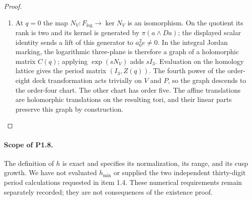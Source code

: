 \begin{proof}
\begin{enumerate}[label=\arabic*.]
\item At $q=0$ the map $N_V:F_{\log}\to\ker N_V$ is an isomorphism.
On the quotient its rank is two and its kernel is generated by
$\pi(a\wedge Da)$; the displayed scalar identity sends a lift of this
generator to $a_0^2e\ne0$.  In the integral Jordan marking, the
logarithmic three-plane is therefore a graph of a holomorphic matrix
$C(q)$; applying $\exp(sN_V)$ adds $sI_3$.  Evaluation on the homology
lattice gives the period matrix $(I_3,Z(q))$.
The fourth power of the order-eight deck transformation acts trivially
on $V$ and $P$, so the graph descends to the order-four chart.
The other chart has order five.  The affine translations are
holomorphic translations on the resulting tori, and their linear
parts preserve this graph by construction.

\end{enumerate}
\end{proof}


\paragraph{Scope of P1.8.}
The definition of $h$ is exact and specifies its normalization, its
range, and its cusp growth.  We have not evaluated $h_{\min}$ or
supplied the two independent thirty-digit period calculations requested
in item 1.4.  These numerical requirements remain separately recorded;
they are not consequences of the existence proof.

